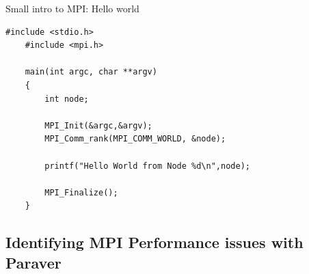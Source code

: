 \documentclass[10pt,xcolor=table]{beamer}
\begin{document}
\begin{frame}[fragile]{Small intro to MPI: Hello world}

 \begin{lstlisting}[style=C,gobble=3,caption={HelloWorld.c}]
    #include <stdio.h>
    #include <mpi.h>

    main(int argc, char **argv)
    {
        int node;
   
        MPI_Init(&argc,&argv);
        MPI_Comm_rank(MPI_COMM_WORLD, &node);
     
        printf("Hello World from Node %d\n",node);
            
        MPI_Finalize();
    }
\end{lstlisting}
\end{frame}

\subsection{Identifying MPI Performance issues with Paraver}
\end{document}
